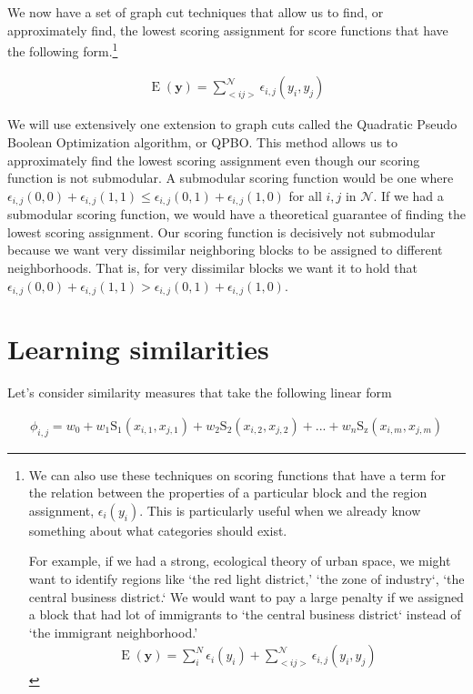 We now have a set of graph cut techniques that allow us to find, or
approximately find, the lowest scoring assignment for score functions
that have the following form.\footnote{We can also use these
  techniques on scoring functions that have a term for the relation
  between the properties of a particular block and the region
  assignment, $\epsilon_i(y_i)$. This is particularly useful when we
  already know something about what categories should exist.

  For example, if we had a strong, ecological theory of urban space,
  we might want to identify regions like `the red light district,'
  `the zone of industry`, `the central business district.` We would
  want to pay a large penalty if we assigned a block that had lot of
  immigrants to `the central business district` instead of `the
  immigrant neighborhood.'
\begin{align}
\operatorname{E}(\mathbf{y}) = \sum_i^N\epsilon_i(y_i) + \sum_{<i j>}^{\mathcal{N}}\epsilon_{i,j}(y_i,y_j)
\end{align}
}

\begin{align}
\operatorname{E}(\mathbf{y}) = \sum_{<i j>}^{\mathcal{N}}\epsilon_{i,j}(y_i,y_j)
\end{align}

We will use extensively one extension to graph cuts called the
Quadratic Pseudo Boolean Optimization algorithm, or QPBO. This method
allows us to approximately find the lowest scoring assignment even
though our scoring function is not submodular. A submodular scoring
function would be one where $\epsilon_{i,j}(0,0) + \epsilon_{i,j}(1,1)
\leq \epsilon_{i,j}(0,1) + \epsilon_{i,j}(1,0)$ for all $i,j$ in
$\mathcal{N}$. If we had a submodular scoring function, we would have a
theoretical guarantee of finding the lowest scoring assignment. Our
scoring function is decisively not submodular because we want
very dissimilar neighboring blocks to be assigned to different
neighborhoods. That is, for very dissimilar blocks we want it to hold that
$\epsilon_{i,j}(0,0) + \epsilon_{i,j}(1,1) \boldsymbol{>}
\epsilon_{i,j}(0,1) + \epsilon_{i,j}(1,0)$.


\section*{Learning similarities}
Let's consider similarity measures that take the following linear form

\begin{align}
\phi_{i,j} = w_0 + w_1\operatorname{S_1}(x_{i,1}, x_{j,1}) +
w_2\operatorname{S_2}(x_{i,2}, x_{j,2}) + ... +
w_n\operatorname{S_z}(x_{i,m},x_{j,m})
\end{align} 


